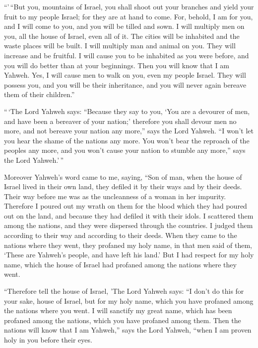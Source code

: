  ``'\,``But you, mountains of Israel, you shall shoot out
your branches and yield your fruit to my people Israel; for they are at
hand to come.  For, behold, I am for you, and I will come
to you, and you will be tilled and sown.  I will multiply
men on you, all the house of Israel, even all of it. The cities will be
inhabited and the waste places will be built.  I will
multiply man and animal on you. They will increase and be fruitful. I
will cause you to be inhabited as you were before, and you will do
better than at your beginnings. Then you will know that I am Yahweh.
 Yes, I will cause men to walk on you, even my people
Israel. They will possess you, and you will be their inheritance, and
you will never again bereave them of their children.''

 ``\,`The Lord Yahweh says: ``Because they say to you,
`You are a devourer of men, and have been a bereaver of your nation;'
 therefore you shall devour men no more, and not bereave
your nation any more,'' says the Lord Yahweh.  ``I won't
let you hear the shame of the nations any more. You won't bear the
reproach of the peoples any more, and you won't cause your nation to
stumble any more,'' says the Lord Yahweh.'\,''

 Moreover Yahweh's word came to me, saying,
 ``Son of man, when the house of Israel lived in their
own land, they defiled it by their ways and by their deeds. Their way
before me was as the uncleanness of a woman in her impurity.
 Therefore I poured out my wrath on them for the blood
which they had poured out on the land, and because they had defiled it
with their idols.  I scattered them among the nations,
and they were dispersed through the countries. I judged them according
to their way and according to their deeds.  When they
came to the nations where they went, they profaned my holy name, in that
men said of them, `These are Yahweh's people, and have left his land.'
 But I had respect for my holy name, which the house of
Israel had profaned among the nations where they went.

 ``Therefore tell the house of Israel, 'The Lord Yahweh
says: ``I don't do this for your sake, house of Israel, but for my holy
name, which you have profaned among the nations where you went.
 I will sanctify my great name, which has been profaned
among the nations, which you have profaned among them. Then the nations
will know that I am Yahweh,'' says the Lord Yahweh, ``when I am proven
holy in you before their eyes.

